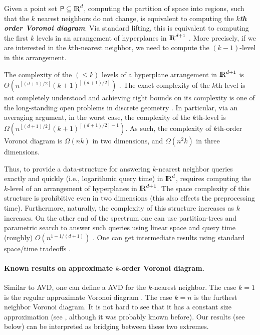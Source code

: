 \documentclass[12pt]{article}
\makeatletter
\newcommand{\emphic}[2]{\textcolor{blue25}{\textbf{\emph{#1}}}\index{#2}}
\newcommand{\emphi}[1]{\emphic{#1}{#1}}
\newcommand{\Term}[1]{\textsf{#1}}
\newcommand{\TermI}[1]{\Term{#1}\index{#1@\Term{#1}}}
\theoremstyle{remark}{\theorembodyfont{\rm} \newtheorem{remark}[theorem]{Remark}}
\newcommand{\pth}[2][\!]{#1\left({#2}\right)}
\newcommand{\ceiling}[1]{\left \lceil {#1} \right \rceil}
\newcommand{\floor}[1]{\left\lfloor {#1} \right\rfloor}
\newcommand{\AVD}{\TermI{AVD}\xspace}
\renewcommand{\Re}{{\rm I\!\hspace{-0.025em} R}}
\newcommand{\PntSet}{\mathsf{P}}
\renewcommand{\th}{th\xspace}
\makeatother
\begin{document}
Given a point set $\PntSet \subseteq \Re^d$, computing the partition
of space into regions, such that the $k$ nearest neighbors do not
change, is equivalent to computing the \emphi{$k$\th order Voronoi
   diagram}.  Via standard lifting, this is equivalent to computing
the first $k$ levels in an arrangement of hyperplanes in $\Re^{d+1}$
\cite{a-vdsfg-91}. More precisely, if we are interested in the
$k$\th-nearest neighbor, we need to compute the $(k-1)$-level in this
arrangement.

The complexity of the $(\leq k)$ levels of a hyperplane arrangement in
$\Re^{d+1}$ is $\Theta( n^{\floor{(d+1)/2}} (k+1)^{\ceiling{(d+1)/2}}
)$ \cite{cs-arscg-89}. The exact complexity of the $k$\th-level is not
completely understood and achieving tight bounds on its complexity is
one of the long-standing open problems in discrete geometry
\cite{m-ldg-02}. In particular, via an averaging argument, in the
worst case, the complexity of the $k$\th-level is $\Omega
\pth{n^{\floor{(d+1)/2} } (k+1)^{\ceiling{(d+1)/2} -1}}$. As such, the
complexity of $k$\th-order Voronoi diagram is $\Omega(n k)$ in two
dimensions, and $\Omega(n^2 k)$ in three dimensions.

Thus, to provide a data-structure for answering $k$-nearest neighbor
queries exactly and quickly (i.e., logarithmic query time) in $\Re^d$,
requires computing the $k$-level of an arrangement of hyperplanes in
$\Re^{d+1}$. The space complexity of this structure is prohibitive
even in two dimensions (this also effects the preprocessing time).
Furthermore, naturally, the complexity of this structure increases as
$k$ increases.  On the other end of the spectrum one can use
partition-trees and parametric search to answer such queries using
linear space and query time (roughly) $O\pth{n^{1-1/(d+1)}}$
\cite{m-ept-92, c-opt-10}. One can get intermediate results using
standard space/time tradeoffs \cite{ae-rsir-98}.

\paragraph{Known results on approximate $k$-order Voronoi diagram.}
Similar to \AVD, one can define a \AVD for the $k$-nearest neighbor.
The case $k=1$ is the regular approximate Voronoi diagram
\cite{h-rvdnl-01, am-lsavd-02, amm-sttan-09}. The case $k=n$ is the
furthest neighbor Voronoi diagram. It is not hard to see that it has a
constant size approximation (see \cite{h-caspm-99}, although it was
probably known before). Our results (see below) can be interpreted as
bridging between these two extremes.
\end{document}
